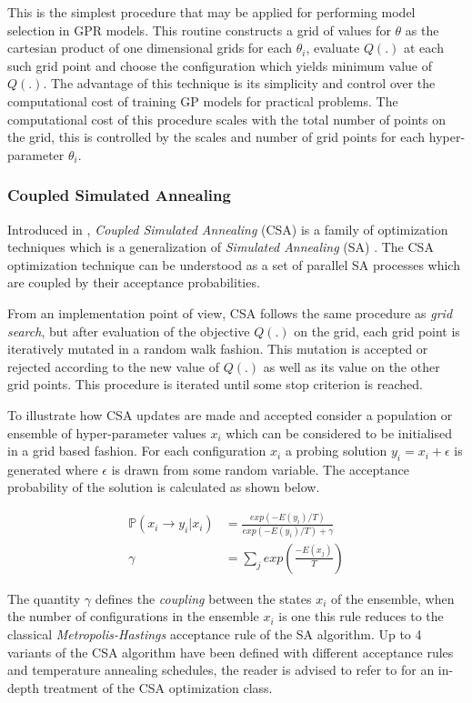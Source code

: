 \documentclass{article}
\begin{document}
This is the simplest procedure that may be applied for performing
model selection in GPR models. This routine constructs a grid of
values for $\theta$ as the cartesian product of one dimensional grids
for each $\theta_i$, evaluate $Q(.)$ at each such grid point and
choose the configuration which yields minimum value of $Q(.)$. The
advantage of this technique is its simplicity and control over the
computational cost of training GP models for practical problems. The
computational cost of this procedure scales with the total number of
points on the grid, this is controlled by the scales and number of
grid points for each hyper-parameter $\theta_i$.

\subsubsection*{Coupled Simulated Annealing}

Introduced in \citet{Xavier-De-Souza2010}, \emph{Coupled Simulated
  Annealing} (CSA) is a family of optimization techniques which is a
generalization of \emph{Simulated Annealing} (SA)
\citep{Kirkpatrick671}. The CSA optimization technique can be
understood as a set of parallel SA processes which are coupled by
their acceptance probabilities.

From an implementation point of view, CSA follows the same procedure
as \emph{grid search}, but after evaluation of the objective $Q(.)$ on
the grid, each grid point is iteratively mutated in a random walk
fashion. This mutation is accepted or rejected according to the new
value of $Q(.)$ as well as its value on the other grid points. This
procedure is iterated until some stop criterion is reached.

To illustrate how CSA updates are made and accepted consider a
population or ensemble of hyper-parameter values ${x_i}$ which can be
considered to be initialised in a grid based fashion. For each
configuration $x_i$ a probing solution $y_i = x_i + \epsilon$ is
generated where $\epsilon$ is drawn from some random variable. The
acceptance probability of the solution is calculated as shown below.

\begin{align*}
  \mathbb{P}(x_i \rightarrow y_i | {x_i}) & = \frac{exp(-E(y_i)/T)}{exp(-E(y_i)/T) + \gamma} \\
  \gamma & = \sum_{j}{exp \left ( \frac{-E(x_j)}{T} \right )}
\end{align*}

The quantity $\gamma$ defines the \emph{coupling} between the states
${x_i}$ of the ensemble, when the number of configurations in the
ensemble $x_i$ is one this rule reduces to the classical
\emph{Metropolis-Hastings} acceptance rule of the SA algorithm. Up to
4 variants of the CSA algorithm have been defined with different
acceptance rules and temperature annealing schedules, the reader is
advised to refer to \citet{Xavier-De-Souza2010} for an in-depth
treatment of the CSA optimization class.  
\end{document}
